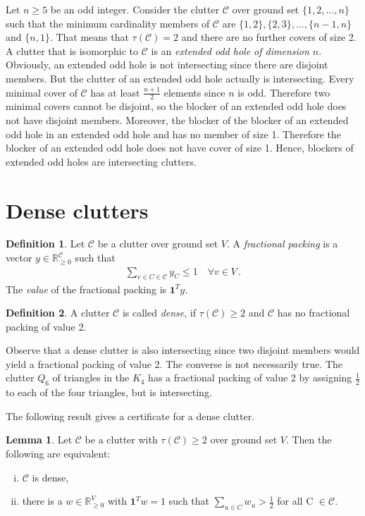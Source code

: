 \documentclass[a4paper, 12pt, twoside=false]{scrbook}
\theoremstyle{definition}
\newtheorem*{definition}{Definition}
\newtheorem{lemma}[theorem]{Lemma}
\newcommand*{\IR}{\ensuremath{\mathbb{R}}}
\begin{document}
Let $n\geq 5$ be an odd integer.
Consider the clutter $\mathcal{C}$ over ground set $\{1,2,\ldots,n\}$ such that the minimum cardinality members of $\mathcal{C}$ are $\{1,2\},\{2,3\},\ldots,\{n-1,n\}$ and $\{n,1\}$.
That means that $\tau(\mathcal{C})=2$ and there are no further covers of size 2.
A clutter that is isomorphic to $\mathcal{C}$ is an \emph{extended odd hole of dimension $n$}\cite{deltas}.
Obviously, an extended odd hole is not intersecting since there are disjoint members.
But the clutter of an extended odd hole actually is intersecting.
Every minimal cover of $\mathcal{C}$ has at least $\frac{n+1}2$ elements since $n$ is odd.
Therefore two minimal covers cannot be disjoint, so the blocker of an extended odd hole does not have disjoint members.
Moreover, the blocker of the blocker of an extended odd hole in an extended odd hole and has no member of size 1.
Therefore the blocker of an extended odd hole does not have cover of size 1.
Hence, blockers of extended odd holes are intersecting clutters.

\section{Dense clutters}
\begin{definition}
    Let $\mathcal{C}$ be a clutter over ground set $V$.
    A \emph{fractional packing} is a vector $y \in \IR_{\geq0}^{\mathcal{C}}$ such that
    \begin{align*}
        \sum_{v \in C \in \mathcal{C}} y_C \leq 1 \quad \forall v \in V \,.
    \end{align*}
    The \emph{value} of the fractional packing is $\textbf{1}^Ty$.
\end{definition}
\begin{definition}
    A clutter $\mathcal{C}$ is called \emph{dense}, if $\tau(\mathcal{C}) \geq 2$ and $\mathcal{C}$ has no fractional packing of value 2.
\end{definition}

Observe that a dense clutter is also intersecting since two disjoint members would yield a fractional packing of value 2.
The converse is not necessarily true.
The clutter $Q_6$ of triangles in the $K_4$ has a fractional packing of value 2 by assigning $\frac 12$ to each of the four triangles, but is intersecting.

The following result gives a certificate for a dense clutter.
\begin{lemma}
    Let $\mathcal{C}$ be a clutter with $\tau(\mathcal{C})\geq 2$ over ground set $V$.
    Then the following are equivalent:
    \leavevmode
    \begin{enumerate}[(i)]
        \item $\mathcal{C}$ is dense,
        \item there is a $w \in \IR_{\geq 0}^V$ with $\textbf{1}^Tw=1$ such that $\sum_{u \in C} w_u > \frac 12$ for all C $\in \mathcal{C}$.
    \end{enumerate}
\end{lemma}
\end{document}
